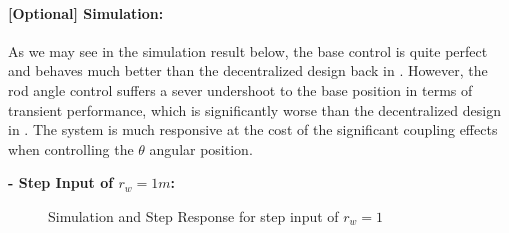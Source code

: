 \documentclass{tron}
\begin{document}
\clearpage
\paragraph{[Optional] Simulation:}
As we may see in the simulation result below, the base control is quite perfect and behaves much better than the decentralized design back in . However, the rod angle control suffers a sever undershoot to the base position in terms of transient performance, which is significantly worse than the decentralized design in . The system is much responsive at the cost of the significant coupling effects when controlling the $\theta$ angular position.
   
\textbf{- Step Input of $r_{w}=1\unit{m}$:}
\begin{figure}[H]
	\centering
	 \quad
	\caption{Simulation and Step Response for step input of $r_w=1$}
	\label{fig:p6a:step-response:rw}
\end{figure}
\end{document}

